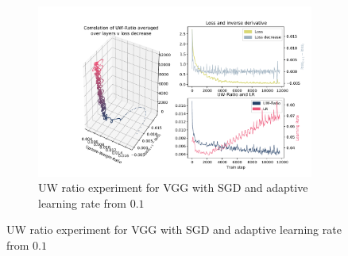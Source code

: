 \begin{figure}

    \begin{subfigure}{\textwidth}
        \centering
        \includegraphics[width=\linewidth]{gfx/diagrams/experiments/ratio_loss_correlation/vgg_sgd_01_0_11700_ratio_schedule.pdf}
        \caption{UW ratio experiment for VGG with SGD and adaptive learning rate
            from $0.1$}
        \label{fig:ratio_loss_corr_vgg_sgd_01_adaptive}
    \end{subfigure}
\end{figure}

